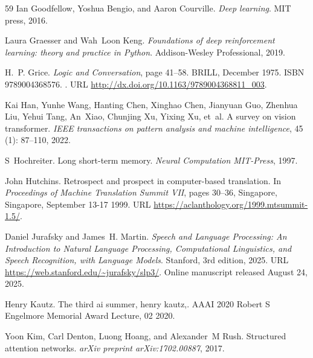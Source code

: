 \begin{thebibliography}{59}
Ian Goodfellow, Yoshua Bengio, and Aaron Courville.
\newblock \emph{Deep learning}.
\newblock MIT press, 2016.

Laura Graesser and Wah~Loon Keng.
\newblock \emph{Foundations of deep reinforcement learning: theory and practice in Python}.
\newblock Addison-Wesley Professional, 2019.

H.~P. Grice.
\newblock \emph{Logic and Conversation}, page 41–58.
\newblock BRILL, December 1975.
\newblock ISBN 9789004368576.
\newblock {}.
\newblock URL \url{http://dx.doi.org/10.1163/9789004368811_003}.

Kai Han, Yunhe Wang, Hanting Chen, Xinghao Chen, Jianyuan Guo, Zhenhua Liu, Yehui Tang, An~Xiao, Chunjing Xu, Yixing Xu, et~al.
\newblock A survey on vision transformer.
\newblock \emph{IEEE transactions on pattern analysis and machine intelligence}, 45 (1): 87--110, 2022.

S~Hochreiter.
\newblock Long short-term memory.
\newblock \emph{Neural Computation MIT-Press}, 1997.

John Hutchins.
\newblock Retrospect and prospect in computer-based translation.
\newblock In \emph{Proceedings of Machine Translation Summit VII}, pages 30--36, Singapore, Singapore, September 13-17 1999.
\newblock URL \url{https://aclanthology.org/1999.mtsummit-1.5/}.

Daniel Jurafsky and James~H. Martin.
\newblock \emph{Speech and Language Processing: An Introduction to Natural Language Processing, Computational Linguistics, and Speech Recognition, with Language Models}.
\newblock Stanford, 3rd edition, 2025.
\newblock URL \url{https://web.stanford.edu/~jurafsky/slp3/}.
\newblock Online manuscript released August 24, 2025.

Henry Kautz.
\newblock The third ai summer, henry kautz,.
\newblock AAAI 2020 Robert S Engelmore Memorial Award Lecture, 02 2020.

Yoon Kim, Carl Denton, Luong Hoang, and Alexander~M Rush.
\newblock Structured attention networks.
\newblock \emph{arXiv preprint arXiv:1702.00887}, 2017.


\end{thebibliography}
